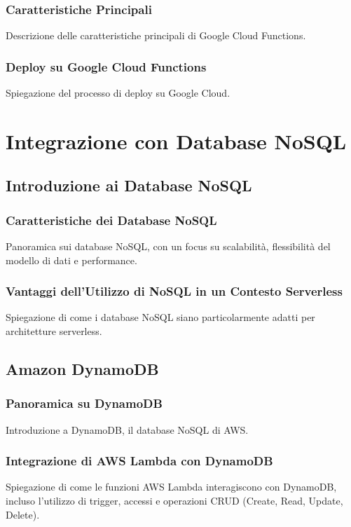 \documentclass[12pt,a4paper,twoside]{book}
\begin{document}
\subsection{Caratteristiche Principali}
Descrizione delle caratteristiche principali di Google Cloud Functions.

\subsection{Deploy su Google Cloud Functions}
Spiegazione del processo di deploy su Google Cloud.

\chapter{Integrazione con Database NoSQL}

\section{Introduzione ai Database NoSQL}
\subsection{Caratteristiche dei Database NoSQL}
Panoramica sui database NoSQL, con un focus su scalabilità, flessibilità del modello di dati e performance.

\subsection{Vantaggi dell'Utilizzo di NoSQL in un Contesto Serverless}
Spiegazione di come i database NoSQL siano particolarmente adatti per architetture serverless.

\section{Amazon DynamoDB}
\subsection{Panoramica su DynamoDB}
Introduzione a DynamoDB, il database NoSQL di AWS.

\subsection{Integrazione di AWS Lambda con DynamoDB}
Spiegazione di come le funzioni AWS Lambda interagiscono con DynamoDB, incluso l'utilizzo di trigger, accessi e operazioni CRUD (Create, Read, Update, Delete).
\end{document}
